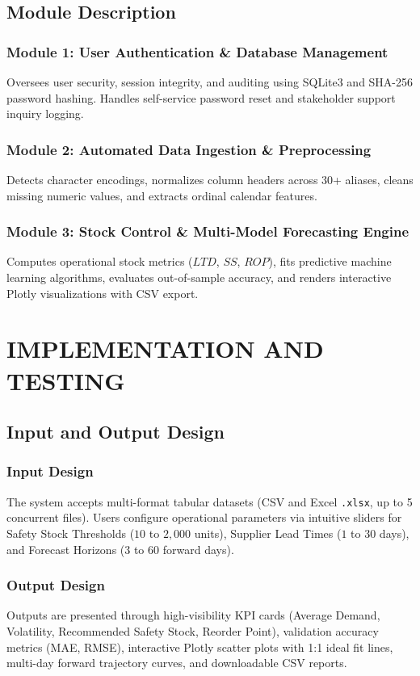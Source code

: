 \documentclass[12pt,a4paper]{report}
\begin{document}
\section{Module Description}
\subsection{Module 1: User Authentication \& Database Management}
Oversees user security, session integrity, and auditing using SQLite3 and SHA-256 password hashing. Handles self-service password reset and stakeholder support inquiry logging.

\subsection{Module 2: Automated Data Ingestion \& Preprocessing}
Detects character encodings, normalizes column headers across 30+ aliases, cleans missing numeric values, and extracts ordinal calendar features.

\subsection{Module 3: Stock Control \& Multi-Model Forecasting Engine}
Computes operational stock metrics ($LTD$, $SS$, $ROP$), fits predictive machine learning algorithms, evaluates out-of-sample accuracy, and renders interactive Plotly visualizations with CSV export.

\newpage
\chapter{IMPLEMENTATION AND TESTING}

\section{Input and Output Design}
\subsection{Input Design}
The system accepts multi-format tabular datasets (CSV and Excel \texttt{.xlsx}, up to 5 concurrent files). Users configure operational parameters via intuitive sliders for Safety Stock Thresholds ($10$ to $2,000$ units), Supplier Lead Times ($1$ to $30$ days), and Forecast Horizons ($3$ to $60$ forward days).

\subsection{Output Design}
Outputs are presented through high-visibility KPI cards (Average Demand, Volatility, Recommended Safety Stock, Reorder Point), validation accuracy metrics (MAE, RMSE), interactive Plotly scatter plots with 1:1 ideal fit lines, multi-day forward trajectory curves, and downloadable CSV reports.
\end{document}
